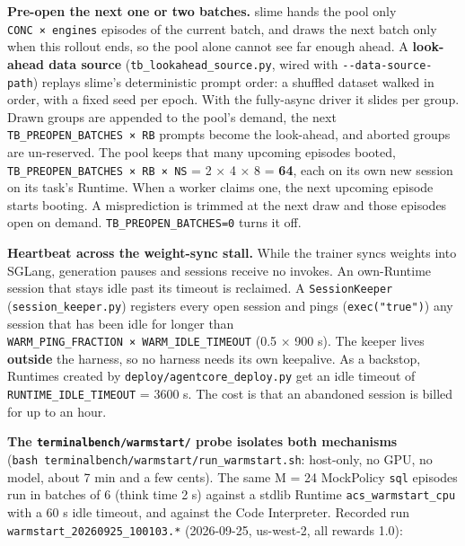 \documentclass[
  paper=a4,
  ,captions=tableheading
]{scrartcl}
\begin{document}
\textbf{Pre-open the next one or two batches.} slime hands the pool only
\texttt{CONC\ ×\ engines} episodes of the current batch, and draws the
next batch only when this rollout ends, so the pool alone cannot see far
enough ahead. A \textbf{look-ahead data source}
(\texttt{tb\_lookahead\_source.py}, wired with
\texttt{-\/-data-source-path}) replays slime's deterministic prompt
order: a shuffled dataset walked in order, with a fixed seed per epoch.
With the fully-async driver it slides per group. Drawn groups are
appended to the pool's demand, the next
\texttt{TB\_PREOPEN\_BATCHES\ ×\ RB} prompts become the look-ahead, and
aborted groups are un-reserved. The pool keeps that many upcoming
episodes booted, \texttt{TB\_PREOPEN\_BATCHES\ ×\ RB\ ×\ NS} = 2 × 4 × 8
= \textbf{64}, each on its own new session on its task's Runtime. When a
worker claims one, the next upcoming episode starts booting. A
misprediction is trimmed at the next draw and those episodes open on
demand. \texttt{TB\_PREOPEN\_BATCHES=0} turns it off.

\textbf{Heartbeat across the weight-sync stall.} While the trainer syncs
weights into SGLang, generation pauses and sessions receive no invokes.
An own-Runtime session that stays idle past its timeout is reclaimed. A
\texttt{SessionKeeper} (\texttt{session\_keeper.py}) registers every
open session and pings (\texttt{exec("true")}) any session that has been
idle for longer than
\texttt{WARM\_PING\_FRACTION\ ×\ WARM\_IDLE\_TIMEOUT} (0.5 × 900 s). The
keeper lives \textbf{outside} the harness, so no harness needs its own
keepalive. As a backstop, Runtimes created by
\texttt{deploy/agentcore\_deploy.py} get an idle timeout of
\texttt{RUNTIME\_IDLE\_TIMEOUT} = 3600 s. The cost is that an abandoned
session is billed for up to an hour.

\textbf{The \texttt{terminalbench/warmstart/} probe isolates both
mechanisms} (\texttt{bash\ terminalbench/warmstart/run\_warmstart.sh}:
host-only, no GPU, no model, about 7 min and a few cents). The same M =
24 MockPolicy \texttt{sql} episodes run in batches of 6 (think time 2 s)
against a stdlib Runtime \texttt{acs\_warmstart\_cpu} with a 60 s idle
timeout, and against the Code Interpreter. Recorded run
\texttt{warmstart\_20260925\_100103.*} (2026-09-25, us-west-2, all
rewards 1.0):
\end{document}
